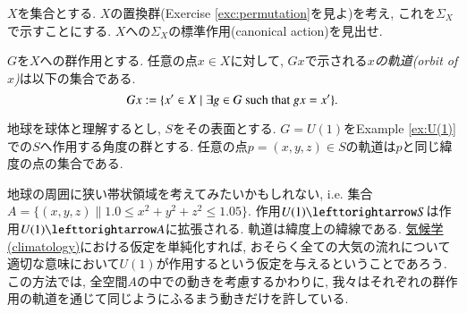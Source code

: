 \begin{exercise}\label{exc:permutation group}
$X$を集合とする. $X$の置換群(Exercise \ref{exc:permutation}を見よ)を考え, これを$\Sigma_X$で示すことにする. $X$への$\Sigma_X$の標準作用(canonical action)を見出せ.
\end{exercise}

\begin{definition}


$G$を$X$への群作用とする. 任意の点$x\in X$に対して, $Gx$で示される\emph{$x$の軌道(orbit of $x$)}は以下の集合である.
$$Gx:=\{x'\in X\|\exists g\in G \tn{ such that }gx=x'\}.$$

\end{definition}

\begin{application}


地球を球体と理解するとし, $S$をその表面とする. $G=U(1)$をExample \ref{ex:U(1)}での$S$へ作用する角度の群とする. 任意の点$p=(x,y,z)\in S$の軌道は$p$と同じ緯度の点の集合である.


地球の周囲に狭い帯状領域を考えてみたいかもしれない, i.e. 集合$A=\{(x,y,z)\|1.0\leq x^2+y^2+z^2\leq 1.05\}$. 作用$U(1)\acts S$は作用$U(1)\acts A$に拡張される. 軌道は緯度上の緯線である. \href{http://en.wikipedia.org/wiki/Climatology}{気候学(climatology)}における仮定を単純化すれば, おそらく全ての大気の流れについて適切な意味において$U(1)$が作用するという仮定を与えるということであろう. この方法では, 全空間$A$の中での動きを考慮するかわりに, 我々はそれぞれの群作用の軌道を通じて同じようにふるまう動きだけを許している.

\end{application}

